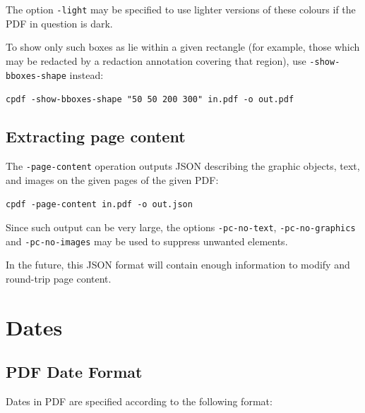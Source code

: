 \documentclass{book}
\begin{document}
\noindent The option \texttt{-light} may be specified to use lighter versions of these colours if the PDF in question is dark.

To show only such boxes as lie within a given rectangle (for example, those which may be redacted by a redaction annotation covering that region), use \texttt{-show-bboxes-shape} instead:

  \begin{framed}
  \small\noindent\verb!cpdf -show-bboxes-shape "50 50 200 300" in.pdf -o out.pdf!
  \end{framed}

\section{Extracting page content}
\label{pagecontent}

The \texttt{-page-content} operation outputs JSON describing the graphic objects, text, and images on the given pages of the given PDF:

  \begin{framed}
  \small\noindent\verb!cpdf -page-content in.pdf -o out.json!
  \end{framed}

\noindent Since such output can be very large, the options \texttt{-pc-no-text}, \texttt{-pc-no-graphics} and \texttt{-pc-no-images} may be used to suppress unwanted elements.

In the future, this JSON format will contain enough information to modify and round-trip page content.

\appendix
\chapter{Dates}\pagestyle{empty}
\label{dates}

\section{PDF Date Format}
Dates in PDF are specified according to the following format:
\end{document}
